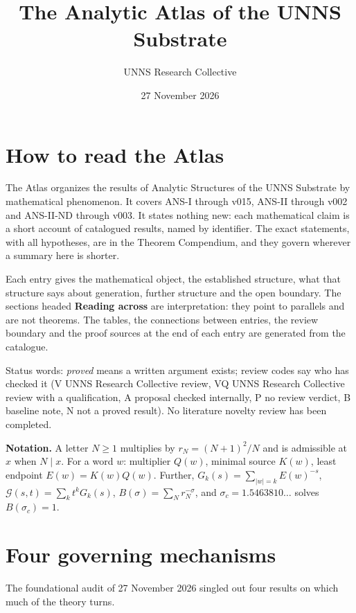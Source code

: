 \documentclass[
  11pt,
]{article}
\title{The Analytic Atlas of the UNNS Substrate}
\author{UNNS Research Collective}
\date{27 November 2026}
\begin{document}
\maketitle

{
\setcounter{tocdepth}{1}
\tableofcontents
}
\hypertarget{how-to-read-the-atlas}{%
\section{How to read the Atlas}\label{how-to-read-the-atlas}}

The Atlas organizes the results of Analytic Structures of the UNNS
Substrate by mathematical phenomenon. It covers ANS-I through v015,
ANS-II through v002 and ANS-II-ND through v003. It states nothing new:
each mathematical claim is a short account of catalogued results, named
by identifier. The exact statements, with all hypotheses, are in the
Theorem Compendium, and they govern wherever a summary here is shorter.

Each entry gives the mathematical object, the established structure,
what that structure says about generation, further structure and the
open boundary. The sections headed \textbf{Reading across} are
interpretation: they point to parallels and are not theorems. The
tables, the connections between entries, the review boundary and the
proof sources at the end of each entry are generated from the catalogue.

Status words: \emph{proved} means a written argument exists; review
codes say who has checked it (V UNNS Research Collective review, VQ UNNS
Research Collective review with a qualification, A proposal checked
internally, P no review verdict, B baseline note, N not a proved
result). No literature novelty review has been completed.

\textbf{Notation.} A letter \(N\ge1\) multiplies by \(r_N=(N+1)^2/N\)
and is admissible at \(x\) when \(N\mid x\). For a word \(w\):
multiplier \(Q(w)\), minimal source \(K(w)\), least endpoint
\(E(w)=K(w)Q(w)\). Further, \(G_k(s)=\sum_{|w|=k}E(w)^{-s}\),
\(\mathcal G(s,t)=\sum_kt^kG_k(s)\), \(B(\sigma)=\sum_Nr_N^{-\sigma}\),
and \(\sigma_c=1.5463810\ldots\) solves \(B(\sigma_c)=1\).

\hypertarget{four-governing-mechanisms}{%
\section{Four governing mechanisms}\label{four-governing-mechanisms}}

The foundational audit of 27 November 2026 singled out four results on
which much of the theory turns.
\end{document}
